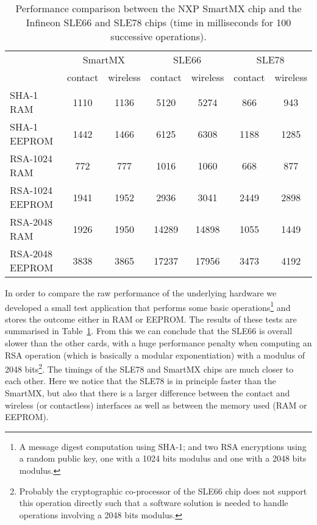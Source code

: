 \begin{table}[t]
  \centering
  \caption{Performance comparison between the NXP SmartMX chip and the Infineon
    SLE66 and SLE78 chips (time in milliseconds for 100 successive operations).}
  \label{tab:comparison}
  \renewcommand{\tabcolsep}{1.25mm}
  \renewcommand{\arraystretch}{1.25}
  \begin{tabular}{l|c|c|c|c|c|c|}
     & \multicolumn{2}{c|}{SmartMX} & \multicolumn{2}{c|}{SLE66} & \multicolumn{2}{c|}{SLE78} \\
     & contact & wireless & contact & wireless & contact & wireless \\\hline
    SHA-1 RAM        & 1110 & 1136 &  5120 &  5274 &  866 &  943 \\\hline
    SHA-1 EEPROM     & 1442 & 1466 &  6125 &  6308 & 1188 & 1285 \\\hline
    RSA-1024 RAM     &  772 &  777 &  1016 &  1060 &  668 &  877 \\\hline
    RSA-1024 EEPROM  & 1941 & 1952 &  2936 &  3041 & 2449 & 2898 \\\hline
    RSA-2048 RAM     & 1926 & 1950 & 14289 & 14898 & 1055 & 1449 \\\hline
    RSA-2048 EEPROM  & 3838 & 3865 & 17237 & 17956 & 3473 & 4192 \\\hline
  \end{tabular}
\end{table}

In order to compare the raw performance of the underlying hardware we developed
a small test application that performs some basic operations\footnote{A message
digest computation using SHA-1; and two RSA encryptions using a random public
key, one with a 1024 bits modulus and one with a 2048 bits modulus.} and stores
the outcome either in RAM or EEPROM. The results of these tests are summarised
in Table~\ref{tab:comparison}. From this we can conclude that the SLE66 is
overall slower than the other cards, with a huge performance penalty when
computing an RSA operation (which is basically a modular exponentiation) with a
modulus of 2048 bits\footnote{Probably the cryptographic co-processor of the
SLE66 chip does not support this operation directly such that a software
solution is needed to handle operations involving a 2048 bits modulus.}. The
timings of the SLE78 and SmartMX chips are much closer to each other. Here we
notice that the SLE78 is in principle faster than the SmartMX, but also that
there is a larger difference between the contact and wireless (or contactless)
interfaces as well as between the memory used (RAM or EEPROM).

